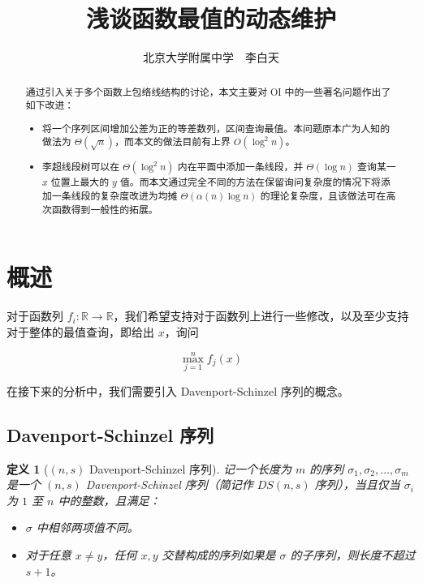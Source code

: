\documentclass{noithesis}
\begin{document}

\newtheorem{Def}{\hspace{2em}定义}
\newtheorem{Thm}{\hspace{2em}定理}
\newtheorem{Lem}{\hspace{2em}引理}
\newtheorem{Pro}{\hspace{2em}例题}

\title{浅谈函数最值的动态维护}
\author{北京大学附属中学~~李白天}

\maketitle

\begin{abstract}

通过引入关于多个函数上包络线结构的讨论，本文主要对 OI 中的一些著名问题作出了如下改进：
\begin{itemize}
\item 将一个序列区间增加公差为正的等差数列，区间查询最值。本问题原本广为人知的做法为 $\Theta(\sqrt n)$，而本文的做法目前有上界 $O(\log^2 n)$。
\item 李超线段树可以在 $\Theta(\log^2n)$ 内在平面中添加一条线段，并 $\Theta(\log n)$ 查询某一 $x$ 位置上最大的 $y$ 值。而本文通过完全不同的方法在保留询问复杂度的情况下将添加一条线段的复杂度改进为均摊 $\Theta(\alpha(n)\log n)$ 的理论复杂度，且该做法可在高次函数得到一般性的拓展。
\end{itemize}

\end{abstract}

\section{概述}

对于函数列 $f_i : \mathbb R \rightarrow \mathbb R$，我们希望支持对于函数列上进行一些修改，以及至少支持对于整体的最值查询，即给出 $x$，询问

$$
\max_{j=1}^n f_j(x)
$$

在接下来的分析中，我们需要引入 Davenport-Schinzel 序列的概念。

\subsection{Davenport-Schinzel 序列}

\begin{Def}[$(n, s)$ Davenport-Schinzel 序列]
记一个长度为 $m$ 的序列 $\sigma_1, \sigma_2, \dots, \sigma_m$ 是一个 $(n, s)$ Davenport-Schinzel 序列（简记作 $DS(n, s)$ 序列），当且仅当 $\sigma_i$ 为 $1$ 至 $n$ 中的整数，且满足：
\begin{itemize}
\item $\sigma$ 中相邻两项值不同。
\item 对于任意 $x\neq y$，任何 $x, y$ 交替构成的序列如果是 $\sigma$ 的子序列，则长度不超过 $s+1$。
\end{itemize}
\end{Def}
\end{document}
